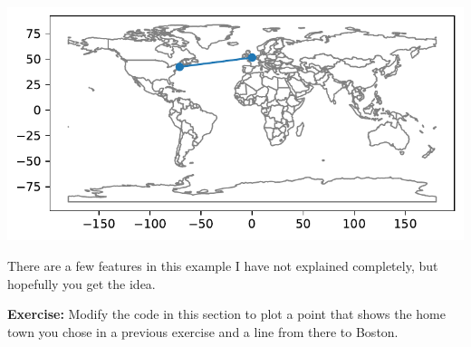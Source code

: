 \begin{center}
\includegraphics[scale=0.75]{02_times_files/02_times_131_0.pdf}
\end{center}

There are a few features in this example I have not explained
completely, but hopefully you get the idea.

\textbf{Exercise:} Modify the code in this section to plot a point that
shows the home town you chose in a previous exercise and a line from
there to Boston.

